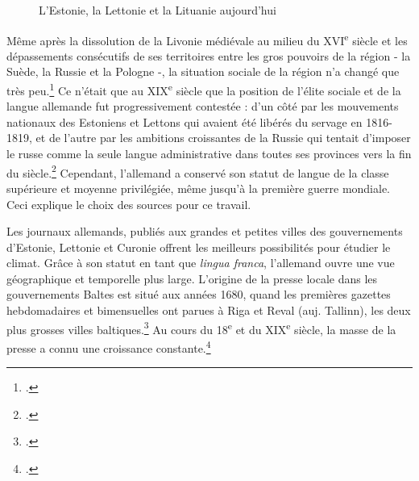 \documentclass[a4paper,twoside,12pt]{article}
\begin{document}
\begin{figure}[!h]
\begin{minipage}[b]{0.5\textwidth}
    \captionsetup{width=0.9\linewidth}
    \caption{L'Estonie, la Lettonie et la Lituanie aujourd'hui}
    \label{fig:balticcountries}
\end{minipage}
\end{figure}

Même après la dissolution de la Livonie médiévale au milieu du XVI\textsuperscript{e} siècle et les dépassements consécutifs de ses territoires entre les gros pouvoirs de la région - la Suède, la Russie et la Pologne -, la situation sociale de la région n'a changé que très peu.\footcites[Paradoxalement, l'allemand reste un élément unifiant à l'époque d'États-nations unitaires, au moins dans le domaine de l'historiographie. Les traitements scientifiques qui prennent en compte la région entière sous la forme et sous les critères qu'elle avait avant le XX\textsuperscript{e} siècle sont ainsi souvent publiés en allemand. Pour les relations internes et externes des pays baltes à partir du Moyen Age jusqu'à la fin du XIX\textsuperscript{e} siècle, cf. par exemple][]{anton_deutschland_2005}{angermann_baltischen_2015}{muhlpfordt_baltische_2016}{sommerlat-michas_baltikum_2015}{hormuth_livonia_2012} Ce n'était que au XIX\textsuperscript{e} siècle que la position de l'élite sociale et de la langue allemande fut progressivement contestée : d'un côté par les mouvements nationaux des Estoniens et Lettons qui avaient été libérés du servage en 1816-1819, et de l'autre par les ambitions croissantes de la Russie qui tentait d'imposer le russe comme la seule langue administrative dans toutes ses provinces vers la fin du siècle.\footcites[Les tensions culturelles et nationales entre les diverses peuples et minorités de la région, ainsi que leurs relations aux différents pouvoirs politiques externes sont les mieux présentées dans][]{angermann_ostseeprovinzen_2005}{plath_esten_2011} Cependant, l'allemand a conservé son statut de langue de la classe supérieure et moyenne privilégiée, même jusqu'à la première guerre mondiale. Ceci explique le choix des sources pour ce travail.

Les journaux allemands, publiés aux grandes et petites villes des gouvernements d'Estonie, Lettonie et Curonie offrent les meilleurs possibilités pour étudier le climat. Grâce à son statut en tant que \textit{lingua franca}, l'allemand ouvre une vue géographique et temporelle plus large. L'origine de la presse locale dans les gouvernements Baltes est situé aux années 1680, quand les premières gazettes hebdomadaires et bimensuelles ont parues à Riga et Reval (auj. Tallinn), les deux plus grosses villes baltiques.\footcites[][16-17]{vanamolder_was_2011}{peegel_eesti_1994} Au cours du 18\textsuperscript{e} et du XIX\textsuperscript{e} siècle, la masse de la presse a connu une croissance constante.\footcite[En 1813-1831, le nombre de revues publiées en Estonie et Livonie était 49; en 1831-1848 : 43, en 1849-1866 : 59; en 1867-1884 : 74.][301]{andresen_eesti_2010}
\end{document}
